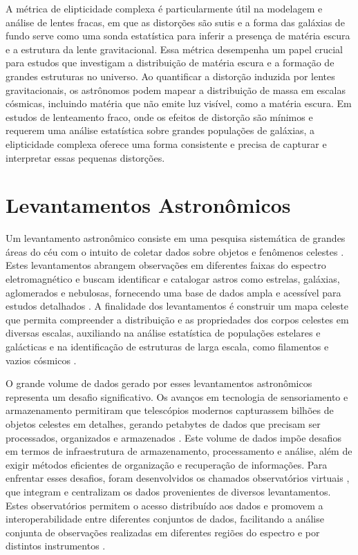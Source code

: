 A métrica de elipticidade complexa é particularmente útil na modelagem e análise de lentes fracas, em que as distorções são sutis e a forma das galáxias de fundo serve como uma sonda estatística para inferir a presença de matéria escura e a estrutura da lente gravitacional. Essa métrica desempenha um papel crucial para estudos que investigam a distribuição de matéria escura e a formação de grandes estruturas no universo. Ao quantificar a distorção induzida por lentes gravitacionais, os astrônomos podem mapear a distribuição de massa em escalas cósmicas, incluindo matéria que não emite luz visível, como a matéria escura. Em estudos de lenteamento fraco, onde os efeitos de distorção são mínimos e requerem uma análise estatística sobre grandes populações de galáxias, a elipticidade complexa oferece uma forma consistente e precisa de capturar e interpretar essas pequenas distorções.







\section{Levantamentos Astronômicos}
\label{sec:surveys}
Um levantamento astronômico consiste em uma pesquisa sistemática de grandes áreas do céu com o intuito de coletar dados sobre objetos e fenômenos celestes \cite[p. 40-42]{extragalactic-astronomy-book}. Estes levantamentos abrangem observações em diferentes faixas do espectro eletromagnético e buscam identificar e catalogar astros como estrelas, galáxias, aglomerados e nebulosas, fornecendo uma base de dados ampla e acessível para estudos detalhados \cite{astronomical-survey}. A finalidade dos levantamentos é construir um mapa celeste que permita compreender a distribuição e as propriedades dos corpos celestes em diversas escalas, auxiliando na análise estatística de populações estelares e galácticas e na identificação de estruturas de larga escala, como filamentos e vazios cósmicos \cite{bahcall1995,baleisis1998,jarrett2004}.

O grande volume de dados gerado por esses levantamentos astronômicos representa um desafio significativo. Os avanços em tecnologia de sensoriamento e armazenamento permitiram que telescópios modernos capturassem bilhões de objetos celestes em detalhes, gerando petabytes de dados que precisam ser processados, organizados e armazenados \cite{szalay2000,graefe1993}. Este volume de dados impõe desafios em termos de infraestrutura de armazenamento, processamento e análise, além de exigir métodos eficientes de organização e recuperação de informações. Para enfrentar esses desafios, foram desenvolvidos os chamados observatórios virtuais \cite{ivoa}, que integram e centralizam os dados provenientes de diversos levantamentos. Estes observatórios permitem o acesso distribuído aos dados e promovem a interoperabilidade entre diferentes conjuntos de dados, facilitando a análise conjunta de observações realizadas em diferentes regiões do espectro e por distintos instrumentos \cite{sciserver}.

